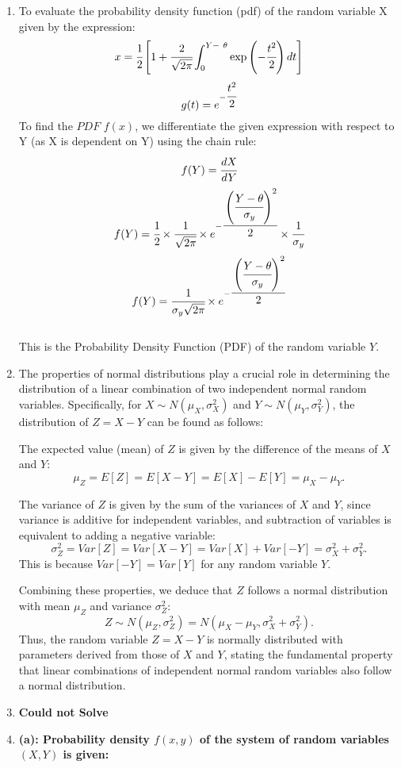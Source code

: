 \documentclass{article}
\begin{document}
\begin{enumerate}
\newpage
\item 
    To evaluate the probability density function (pdf) of the random variable X given by the expression:
    \[
        x = \cfrac{1}{2}\left[1 + \cfrac{2}{\sqrt{2\pi}}\int_{0}^{Y -\  \theta} \exp\left(-\cfrac{t^2}{2}\right) dt\right]
    \]
    \[
        g(t) = e^{-\cfrac{t^2}{2}}
    \]
    To find the \(PDF\) $f(x)$, we differentiate the given expression with respect to Y (as X is dependent on Y) using the chain rule:
    \[
        f(Y) = \cfrac{dX}{dY}
    \]
    \[
        f(Y) = \cfrac{1}{2}\times \cfrac{1}{\sqrt{2\pi}} \times e^{-\cfrac{\left(\cfrac{Y - \theta}{\sigma_y}\right)^2}{2}} \times \cfrac{1}{\sigma_y}
    \]
    \[
        f(Y) = \cfrac{1}{\sigma_y\sqrt{2\pi}} \times e^{-\cfrac{\left(\cfrac{Y - \theta}{\sigma_y}\right)^2}{2}}
    \]\\
    This is the Probability Density Function (PDF) of the random variable \(Y\).

\newpage
\item
    The properties of normal distributions play a crucial role in determining the distribution of a linear combination of two independent normal random variables. Specifically, for $X \sim N(\mu_X, \sigma_X^2)$ and $Y \sim N(\mu_Y, \sigma_Y^2)$, the distribution of $Z = X - Y$ can be found as follows:

    The expected value (mean) of $Z$ is given by the difference of the means of $X$ and $Y$:
    \[
    \mu_Z = E[Z] = E[X - Y] = E[X] - E[Y] = \mu_X - \mu_Y.
    \]

    The variance of $Z$ is given by the sum of the variances of $X$ and $Y$, since variance is additive for independent variables, and subtraction of variables is equivalent to adding a negative variable:
    \[
    \sigma_Z^2 = Var[Z] = Var[X - Y] = Var[X] + Var[-Y] = \sigma_X^2 + \sigma_Y^2.
    \]
    This is because $Var[-Y] = Var[Y]$ for any random variable $Y$.

    Combining these properties, we deduce that $Z$ follows a normal distribution with mean $\mu_Z$ and variance $\sigma_Z^2$:
    \[
    Z \sim N(\mu_Z, \sigma_Z^2) = N(\mu_X - \mu_Y, \sigma_X^2 + \sigma_Y^2).
    \]
    Thus, the random variable $Z = X - Y$ is normally distributed with parameters derived from those of $X$ and $Y$, stating the fundamental property that linear combinations of independent normal random variables also follow a normal distribution.

\newpage
\item
\textbf{Could not Solve}
\newpage
\item
    \textbf{(a): Probability density \( f(x, y) \) of the system of random variables \( (X, Y) \) is given:}


\end{enumerate}
\end{document}
